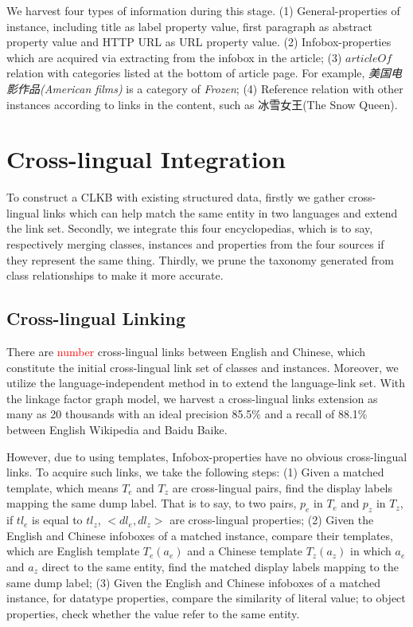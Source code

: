 \documentclass[runningheads,a4paper]{llncs}
\begin{document}
We harvest four types of information during this stage. (1) General-properties of instance, including title as label property value, first paragraph as abstract property value and HTTP URL as URL property value. (2) Infobox-properties which are acquired via extracting from the infobox in the article; (3) $articleOf$ relation with categories listed at the bottom of article page. For example, \textit{美国电影作品(American films)} is a category of \textit{Frozen}; (4) Reference relation with other instances according to links in the content, such as 冰雪女王(The Snow Queen).

\section{Cross-lingual Integration}
\label{sec:clkbb}

To construct a CLKB with existing structured data, firstly we gather cross-lingual links which can help match the same entity in two languages and extend the link set. Secondly, we integrate this four encyclopedias, which is to say, respectively merging classes, instances and properties from the four sources if they represent the same thing. Thirdly, we prune the taxonomy generated from class relationships to make it more accurate. 

\subsection{Cross-lingual Linking}
There are \textcolor{red}{number} cross-lingual links between English and Chinese, which constitute the initial cross-lingual link set of classes and instances. Moreover, we utilize the language-independent method in \cite{wang2012cross} to extend the language-link set. With the linkage factor graph model, we harvest a cross-lingual links extension as many as 20 thousands with an ideal precision 85.5\% and a recall of 88.1\% between English Wikipedia and Baidu Baike.

However, due to using templates, Infobox-properties have no obvious cross-lingual links. To acquire such links, we take the following steps: (1) Given a matched template, which means $T_{e}$ and $T_{z}$ are cross-lingual pairs, find the display labels mapping the same dump label. That is to say, to two pairs, $p_{e}$ in $T_{e}$ and $p_{z}$ in $T_{z}$, if $tl_{e}$ is equal to $tl_{z}$, $<dl_{e},dl_{z}>$ are cross-lingual properties; (2) Given the English and Chinese infoboxes of a matched instance, compare their templates, which are English template $T_{e}(a_{e})$ and a Chinese template $T_{z}(a_{z})$ in which $a_{e}$ and $a_{z}$ direct to the same entity, find the matched display labels mapping to the same dump label; (3) Given the English and Chinese infoboxes of a matched instance, for datatype properties, compare the similarity of literal value; to object properties, check whether the value refer to the same entity.
\end{document}
